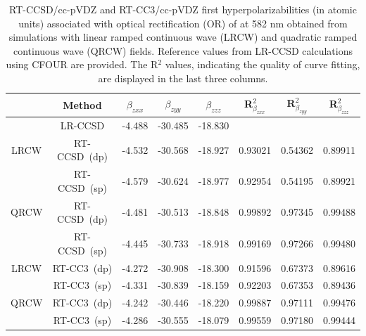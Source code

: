 \begin{table}
  \centering
    \caption{RT-CCSD/cc-pVDZ and RT-CC3/cc-pVDZ first hyperpolarizabilities (in atomic units) associated with optical rectification (OR) of  at 582 nm obtained from simulations with linear ramped continuous wave (LRCW) and quadratic ramped continuous wave (QRCW) fields. Reference values from LR-CCSD calculations using CFOUR are provided. The R$^{2}$ values, indicating the quality of curve fitting, are displayed in the last three columns.}
  \begin{tabular}{c|c|ccc|ccc}
                                        &  \textrm{Method}  & $\beta_{zxx}$ & $\beta_{zyy}$ & $\beta_{zzz}$ 
                                          & R$^{2}_{\beta_{zxx}}$ & R$^{2}_{\beta_{zyy}}$ & R$^{2}_{\beta_{zzz}}$\\
                                          \hline
   & \textrm{LR-CCSD} & -4.488 & -30.485 & -18.830 & & &\\  
    \hline                                     
    \textrm{LRCW} & \textrm{RT-CCSD\ (dp)} & -4.532 & -30.568 &  -18.927 & 0.93021 & 0.54362 & 0.89911 \\
                              &   \textrm{RT-CCSD\ (sp)} &  -4.579 & -30.624 & -18.977 & 0.92954 & 0.54195 & 0.89921 \\
    \hline
    \textrm{QRCW} & \textrm{RT-CCSD\ (dp)} & -4.481 & -30.513 &  -18.848 & 0.99892 & 0.97345 & 0.99488 \\
                              &   \textrm{RT-CCSD\ (sp)} &  -4.445 & -30.733 & -18.918 & 0.99169 & 0.97266 & 0.99480 \\
    \hline\hline
     \textrm{LRCW} & \textrm{RT-CC3\ (dp)} & -4.272 & -30.908 & -18.300 & 0.91596 & 0.67373 & 0.89616 \\
                               &   \textrm{RT-CC3\ (sp)} & -4.331 & -30.839 & -18.159 & 0.92203 & 0.67353 & 0.89436 \\
      \hline
      \textrm{QRCW} & \textrm{RT-CC3\ (dp)} & -4.242 & -30.446 & -18.220 & 0.99887 & 0.97111 & 0.99476 \\
                               &   \textrm{RT-CC3\ (sp)} & -4.286 & -30.555 & -18.079 & 0.99559 & 0.97180 & 0.99444 \\
  \end{tabular}
  \label{tab:hyp-or}
\end{table}
